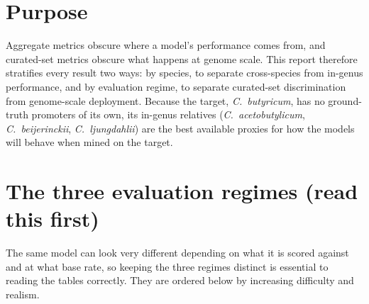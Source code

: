 \documentclass{article}
\begin{document}
\section{Purpose}
Aggregate metrics obscure where a model's performance comes from, and curated-set metrics obscure what happens at genome scale. This report therefore stratifies every result two ways: by species, to separate cross-species from in-genus performance, and by evaluation regime, to separate curated-set discrimination from genome-scale deployment. Because the target, \emph{C.\ butyricum}, has no ground-truth promoters of its own, its in-genus relatives (\emph{C.\ acetobutylicum}, \emph{C.\ beijerinckii}, \emph{C.\ ljungdahlii}) are the best available proxies for how the models will behave when mined on the target.

\section{The three evaluation regimes (read this first)}
The same model can look very different depending on what it is scored against and at what base rate, so keeping the three regimes distinct is essential to reading the tables correctly. They are ordered below by increasing difficulty and realism.
\end{document}
